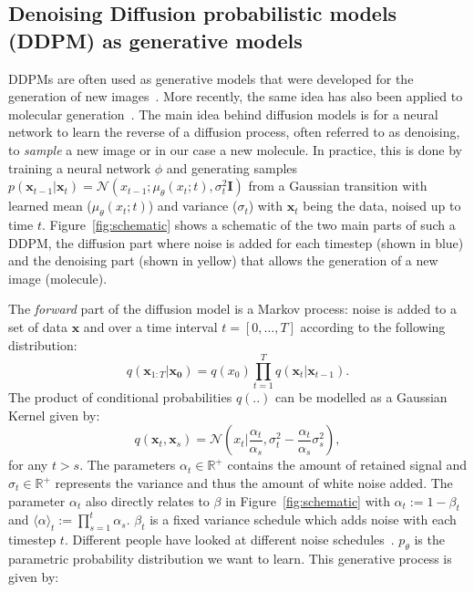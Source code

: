 \documentclass[journal=jacsat,manuscript=article]{achemso}
\begin{document}
\subsection*{Denoising Diffusion probabilistic models (DDPM) as generative models}
DDPMs are often used as generative models that were developed for the generation of new images~\cite{sohl-dickstein2015deep, ho2020denoising, nichol2021improved}. More recently, the same idea has also been applied to molecular generation~\cite{hoogeboom2022equivariant}. The main idea behind diffusion models is for a neural network to learn the reverse of a diffusion process, often referred to as denoising, to \textit{sample} a new image or in our case a new molecule. In practice, this is done by training a neural network $\phi$ and generating samples $p(\mathbf{x}_{t-1}|\mathbf{x}_t)=\mathcal{N}(x_{t-1}; \mu_{\theta}(x_t;t), \sigma_t^2\mathbf{I})$ from  a Gaussian transition with learned mean ($\mu_{\theta}(x_t;t)$) and variance ($\sigma_t$) with $\mathbf{x}_t$ being the data, noised up to time $t$. Figure~\ref{fig:schematic} shows a schematic of the two main parts of such a DDPM, the diffusion part where noise is added for each timestep (shown in blue) and the denoising part (shown in yellow) that allows the generation of a new image (molecule).

The \textit{forward} part of the diffusion model is a Markov process: noise is added to a set of data $\mathbf{x}$ and over a time interval $t = [0,\ldots,T]$ according to the following distribution:
\begin{equation}
  q(\mathbf{x}_{1:T}|\mathbf{x_0}) = q(x_0)\prod_{t=1}^T q(\mathbf{x}_t|\mathbf{x}_{t-1}).
\end{equation}
The product of conditional probabilities $q(..)$ can be modelled as a Gaussian Kernel given by:
\begin{equation}
    q(\mathbf{x}_t, \mathbf{x}_s)=\mathcal{N}(x_t|\frac{\alpha_t}{\alpha_s}, \sigma_t^2-\frac{\alpha_t}{\alpha_s}\sigma^2_s),
\end{equation}
for any $t>s$. The parameters $\alpha_t \in \mathbb{R}^{+}$ contains the amount of retained signal and $\sigma_t \in \mathbb{R}^{+}$ represents the variance and thus the amount of white noise added. The parameter $\alpha_t$ also directly relates to $\beta$ in Figure~\ref{fig:schematic} with $\alpha_t:=1-\beta_t$ and $\langle\alpha\rangle_t:=\prod_{s=1}^t\alpha_s$. $\beta_t$ is a fixed variance schedule which adds noise with each timestep $t$.
Different people have looked at different noise schedules~\cite{sohl-dickstein2015deep, ho2020denoising}.
$p_{\theta}$ is the parametric probability distribution we want to learn. This generative process is given by:
\end{document}
